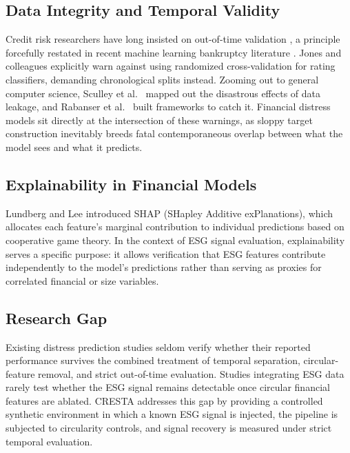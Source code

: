 \documentclass[sigconf,anonymous]{acmart}
\begin{document}
\subsection{Data Integrity and Temporal Validity}
Credit risk researchers have long insisted on out-of-time validation \cite{lessmann2015, bellotti2009}, a principle forcefully restated in recent machine learning bankruptcy literature \cite{barboza2017}. Jones and colleagues \cite{jones2017} explicitly warn against using randomized cross-validation for rating classifiers, demanding chronological splits instead. Zooming out to general computer science, Sculley et al.\ \cite{sculley2015} mapped out the disastrous effects of data leakage, and Rabanser et al.\ \cite{rabanser2019} built frameworks to catch it. Financial distress models sit directly at the intersection of these warnings, as sloppy target construction inevitably breeds fatal contemporaneous overlap between what the model sees and what it predicts.

\subsection{Explainability in Financial Models}
Lundberg and Lee \cite{lundberg2017} introduced SHAP (SHapley Additive exPlanations), which allocates each feature's marginal contribution to individual predictions based on cooperative game theory. In the context of ESG signal evaluation, explainability serves a specific purpose: it allows verification that ESG features contribute independently to the model's predictions rather than serving as proxies for correlated financial or size variables.

\subsection{Research Gap}
Existing distress prediction studies seldom verify whether their reported performance survives the combined treatment of temporal separation, circular-feature removal, and strict out-of-time evaluation. Studies integrating ESG data rarely test whether the ESG signal remains detectable once circular financial features are ablated. CRESTA addresses this gap by providing a controlled synthetic environment in which a known ESG signal is injected, the pipeline is subjected to circularity controls, and signal recovery is measured under strict temporal evaluation.


\end{document}
